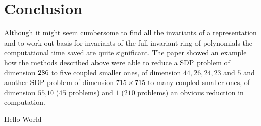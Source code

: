 \documentclass[]{article}
\begin{document}
\section*{Conclusion}
Although it might seem cumbersome to find all the invariants of a representation and to work out basis for invariants of the full invariant ring of polynomials the computational time saved are quite significant. The paper showed an example how the methods described above were able to reduce a SDP problem of dimension $286\time286$ to five coupled smaller ones, of dimension $44,26,24,23$ and $5$ and another SDP problem of dimension $715\times715$ to many coupled smaller ones, of dimension $55$,$10$ ($45$ problems) and $1$ ($210$ problems) an obvious reduction in computation.


\cite{Gatermann_2004}



Hello World

\printbibliography
\end{document}

